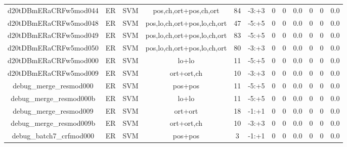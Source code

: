 \documentclass[a4paper]{article}
\begin{document}
\begin{landscape}
\begin{center}
\begin{tabular}{ |c|c|c|c|c|c|c|c|c|c|c|c|}
 
 	
 	\small{ d20tDBmERaCRFw5mod044 } & ER & SVM & pos,ch,ort+pos,ch,ort  &  84 &  -3:+3  &  0 & 0 & 0.0  &  0 & 0 & 0.0 \\
 	

 
 	
 	\small{ d20tDBmERaCRFw5mod048 } & ER & SVM & pos,lo,ch,ort+pos,lo,ch,ort  &  47 &  -5:+5  &  0 & 0 & 0.0  &  0 & 0 & 0.0 \\
 	

 
 	
 	\small{ d20tDBmERaCRFw5mod049 } & ER & SVM & pos,lo,ch,ort+pos,lo,ch,ort  &  83 &  -5:+5  &  0 & 0 & 0.0  &  0 & 0 & 0.0 \\
 	

 
 	
 	\small{ d20tDBmERaCRFw5mod050 } & ER & SVM & pos,lo,ch,ort+pos,lo,ch,ort  &  80 &  -3:+3  &  0 & 0 & 0.0  &  0 & 0 & 0.0 \\
 	

 
 	
 	\small{ d20tDBmERaCRFw5mod000 } & ER & SVM & lo+lo  &  11 &  -5:+5  &  0 & 0 & 0.0  &  0 & 0 & 0.0 \\
 	

 
 	
 	\small{ d20tDBmERaCRFw5mod009 } & ER & SVM & ort+ort,ch  &  10 &  -3:+3  &  0 & 0 & 0.0  &  0 & 0 & 0.0 \\
 	

 
 	
 	\small{ debug\_merge\_resmod000 } & ER & SVM & pos+pos  &  11 &  -5:+5  &  0 & 0 & 0.0  &  0 & 0 & 0.0 \\
 	

 
 	
 	\small{ debug\_merge\_resmod000b } & ER & SVM & lo+lo  &  11 &  -5:+5  &  0 & 0 & 0.0  &  0 & 0 & 0.0 \\
 	

 
 	
 	\small{ debug\_merge\_resmod009 } & ER & SVM & ort+ort  &  18 &  -1:+1  &  0 & 0 & 0.0  &  0 & 0 & 0.0 \\
 	

 
 	
 	\small{ debug\_merge\_resmod009b } & ER & SVM & ort+ort,ch  &  10 &  -3:+3  &  0 & 0 & 0.0  &  0 & 0 & 0.0 \\
 	

 
 	
 	\small{ debug\_batch7\_crfmod000 } & ER & SVM & pos+pos  &  3 &  -1:+1  &  0 & 0 & 0.0  &  0 & 0 & 0.0 \\
 	


\end{tabular}
\end{center}
\end{landscape}
\end{document}
